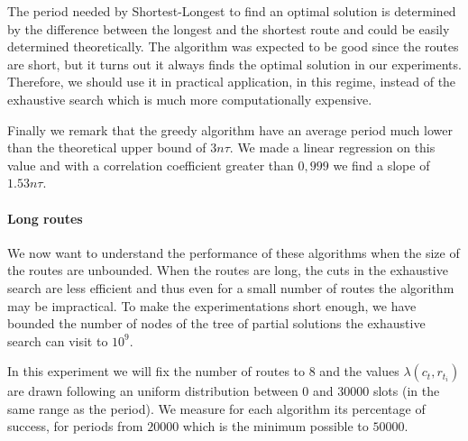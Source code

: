 \documentclass[a4paper,10pt]{article}
\begin{document}
      The period needed by Shortest-Longest to find an optimal solution is determined by the difference between the longest and the shortest route and could be easily determined theoretically. The algorithm was expected to be good since the routes are short, but it turns out it always finds the optimal solution in our experiments. Therefore, we should use it in practical application, in this regime, instead of the exhaustive search which is much more computationally expensive. 
      
      Finally we remark that the greedy algorithm have an average period much lower than the theoretical upper bound of $3n\tau$. We made a linear regression on this value and with a correlation coefficient greater than $0,999$ we find a slope of $1.53n\tau$.
      
      

      \paragraph{Long routes}
      
      We now want to understand the performance of these algorithms when the size of the routes are unbounded. When the routes are long, the cuts in the exhaustive search are less efficient and thus even for a small number of routes the algorithm may be impractical. To make the experimentations short enough, we have bounded the number of nodes of the tree of partial solutions the exhaustive search can visit to $10^9$.
      
      In this experiment we will fix the number of routes to $8$ and the values $\lambda(c_t,r_{t_i})$ are drawn following an uniform distribution between $0$ and $30000$ slots (in the same range as the period).
      We measure for each algorithm its percentage of success, for periods from $20000$ which is the minimum possible to $50000$.
      
\end{document}
